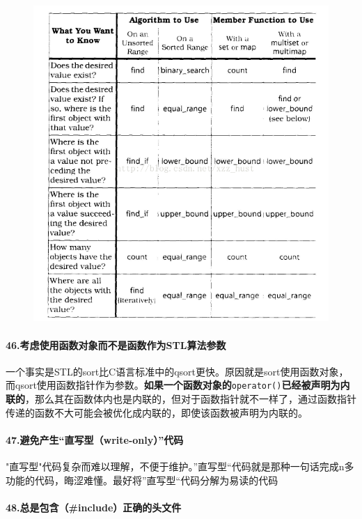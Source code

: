 \documentclass[UTF8,a4paper,12pt]{ctexbook}
\begin{document}
				\begin{figure}[h]
					\centering
					\includegraphics[scale = 0.7]{STL-Effective.png}
				\end{figure}
			\paragraph{46.考虑使用函数对象而不是函数作为STL算法参数} 一个事实是STL的sort比C语言标准中的qsort更快。原因就是sort使用函数对象，而qsort使用函数指针作为参数。\textbf{如果一个函数对象的}\verb|operator()|\textbf{已经被声明为内联的}，那么其在函数体内也是内联的，但对于函数指针就不一样了，通过函数指针传递的函数不大可能会被优化成内联的，即使该函数被声明为内联的。
			
			\paragraph{47.避免产生“直写型（write-only）”代码} "直写型"代码复杂而难以理解，不便于维护。”直写型“代码就是那种一句话完成n多功能的代码，晦涩难懂。最好将”直写型“代码分解为易读的代码
			
			\paragraph{48.总是包含（\#include）正确的头文件}
\end{document}
